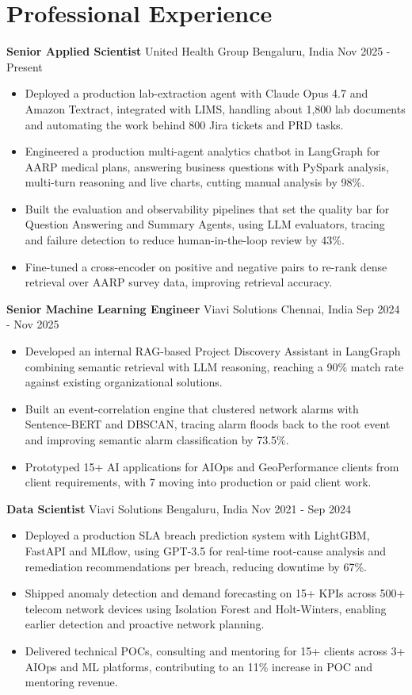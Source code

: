 \documentclass[10pt,a4paper]{article}
\newcommand{\role}[4]{\textbf{#1} \textbar{} #2 \hfill #3 \textbar{} #4\par}
\begin{document}
\section{Professional Experience}
\role{Senior Applied Scientist}{United Health Group}{Bengaluru, India}{Nov 2025 - Present}
\begin{itemize}
  \item Deployed a production lab-extraction agent with Claude Opus 4.7 and Amazon Textract, integrated with LIMS, handling about 1,800 lab documents and automating the work behind 800 Jira tickets and PRD tasks.
  \item Engineered a production multi-agent analytics chatbot in LangGraph for AARP medical plans, answering business questions with PySpark analysis, multi-turn reasoning and live charts, cutting manual analysis by 98\%.
  \item Built the evaluation and observability pipelines that set the quality bar for Question Answering and Summary Agents, using LLM evaluators, tracing and failure detection to reduce human-in-the-loop review by 43\%.
  \item Fine-tuned a cross-encoder on positive and negative pairs to re-rank dense retrieval over AARP survey data, improving retrieval accuracy.
\end{itemize}
\vspace{3pt}
\role{Senior Machine Learning Engineer}{Viavi Solutions}{Chennai, India}{Sep 2024 - Nov 2025}
\begin{itemize}
  \item Developed an internal RAG-based Project Discovery Assistant in LangGraph combining semantic retrieval with LLM reasoning, reaching a 90\% match rate against existing organizational solutions.
  \item Built an event-correlation engine that clustered network alarms with Sentence-BERT and DBSCAN, tracing alarm floods back to the root event and improving semantic alarm classification by 73.5\%.
  \item Prototyped 15+ AI applications for AIOps and GeoPerformance clients from client requirements, with 7 moving into production or paid client work.
\end{itemize}
\vspace{3pt}
\role{Data Scientist}{Viavi Solutions}{Bengaluru, India}{Nov 2021 - Sep 2024}
\begin{itemize}
  \item Deployed a production SLA breach prediction system with LightGBM, FastAPI and MLflow, using GPT-3.5 for real-time root-cause analysis and remediation recommendations per breach, reducing downtime by 67\%.
  \item Shipped anomaly detection and demand forecasting on 15+ KPIs across 500+ telecom network devices using Isolation Forest and Holt-Winters, enabling earlier detection and proactive network planning.
  \item Delivered technical POCs, consulting and mentoring for 15+ clients across 3+ AIOps and ML platforms, contributing to an 11\% increase in POC and mentoring revenue.
\end{itemize}
\end{document}

